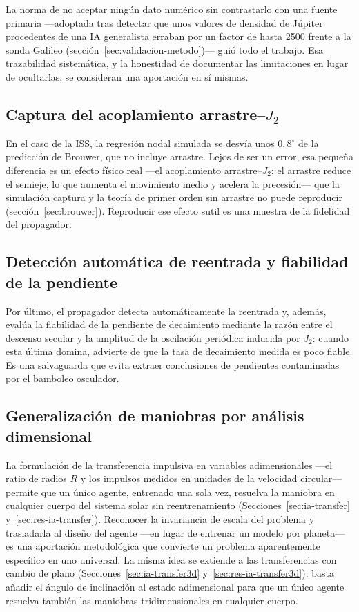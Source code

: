 La norma de no aceptar ningún dato numérico sin contrastarlo con una fuente primaria ---adoptada tras detectar que unos valores de densidad de Júpiter procedentes de una \gls{IA} generalista erraban por un factor de hasta 2500 frente a la sonda Galileo (sección~\ref{sec:validacion-metodo})--- guió todo el trabajo. Esa trazabilidad sistemática, y la honestidad de documentar las limitaciones en lugar de ocultarlas, se consideran una aportación en sí mismas.

\subsection{Captura del acoplamiento arrastre--$J_2$}

En el caso de la \gls{ISS}, la regresión nodal simulada se desvía unos $0{,}8^\circ$ de la predicción de Brouwer, que no incluye arrastre. Lejos de ser un error, esa pequeña diferencia es un efecto físico real ---el acoplamiento arrastre--$J_2$: el arrastre reduce el semieje, lo que aumenta el movimiento medio y acelera la precesión--- que la simulación captura y la teoría de primer orden sin arrastre no puede reproducir (sección~\ref{sec:brouwer}). Reproducir ese efecto sutil es una muestra de la fidelidad del propagador.

\subsection{Detección automática de reentrada y fiabilidad de la pendiente}

Por último, el propagador detecta automáticamente la reentrada y, además, evalúa la fiabilidad de la pendiente de decaimiento mediante la razón entre el descenso secular y la amplitud de la oscilación periódica inducida por $J_2$: cuando esta última domina, advierte de que la tasa de decaimiento medida es poco fiable. Es una salvaguarda que evita extraer conclusiones de pendientes contaminadas por el bamboleo osculador.

\subsection{Generalización de maniobras por análisis dimensional}

La formulación de la transferencia impulsiva en variables adimensionales ---el ratio de radios $R$ y los impulsos medidos en unidades de la velocidad circular--- permite que un único agente, entrenado una sola vez, resuelva la maniobra en cualquier cuerpo del sistema solar sin reentrenamiento (Secciones~\ref{sec:ia-transfer} y~\ref{sec:res-ia-transfer}). Reconocer la invariancia de escala del problema y trasladarla al diseño del agente ---en lugar de entrenar un modelo por planeta--- es una aportación metodológica que convierte un problema aparentemente específico en uno universal. La misma idea se extiende a las transferencias con cambio de plano (Secciones~\ref{sec:ia-transfer3d} y~\ref{sec:res-ia-transfer3d}): basta añadir el ángulo de inclinación al estado adimensional para que un único agente resuelva también las maniobras tridimensionales en cualquier cuerpo.

